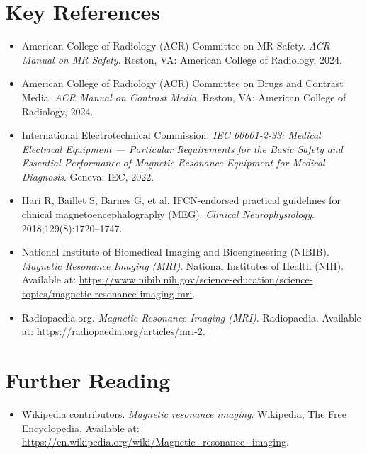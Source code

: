 \section{Key References}
\begin{itemize}
  \item American College of Radiology (ACR) Committee on MR Safety. \textit{ACR Manual on MR Safety}. Reston, VA: American College of Radiology, 2024.
  \item American College of Radiology (ACR) Committee on Drugs and Contrast Media. \textit{ACR Manual on Contrast Media}. Reston, VA: American College of Radiology, 2024.
  \item International Electrotechnical Commission. \textit{IEC 60601-2-33: Medical Electrical Equipment --- Particular Requirements for the Basic Safety and Essential Performance of Magnetic Resonance Equipment for Medical Diagnosis}. Geneva: IEC, 2022.
  \item Hari R, Baillet S, Barnes G, et al. IFCN-endorsed practical guidelines for clinical magnetoencephalography (MEG). \textit{Clinical Neurophysiology}. 2018;129(8):1720--1747.
  \item National Institute of Biomedical Imaging and Bioengineering (NIBIB). \textit{Magnetic Resonance Imaging (MRI)}. National Institutes of Health (NIH). Available at: \url{https://www.nibib.nih.gov/science-education/science-topics/magnetic-resonance-imaging-mri}.
  \item Radiopaedia.org. \textit{Magnetic Resonance Imaging (MRI)}. Radiopaedia. Available at: \url{https://radiopaedia.org/articles/mri-2}.
\end{itemize}

\section{Further Reading}
\begin{itemize}
  \item Wikipedia contributors. \textit{Magnetic resonance imaging}. Wikipedia, The Free Encyclopedia. Available at: \url{https://en.wikipedia.org/wiki/Magnetic_resonance_imaging}.
\end{itemize}
